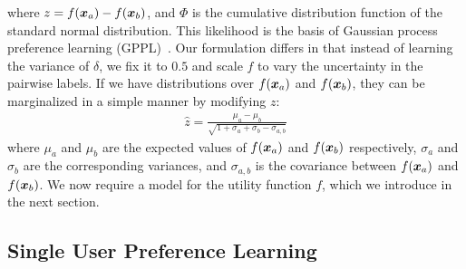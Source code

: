 where $z = f(\boldsymbol x_a) - f(\boldsymbol x_b)$,
and $\Phi$ is the cumulative distribution function of the standard normal distribution. 
This likelihood is the basis of Gaussian process preference learning (GPPL)~\citep{chu2005preference}. 
Our formulation differs in that instead of learning the variance of $\delta$, we fix it 
to $0.5$ and scale $f$ to vary the uncertainty in the pairwise labels.
If we have distributions over $f(\boldsymbol x_a)$ and $f(\boldsymbol x_b)$, they can be marginalized in a simple manner %
by modifying $z$:
\begin{align}
\hat{z} = \frac{\mu_a - \mu_b}{\sqrt{1 + \sigma_a + \sigma_b - \sigma_{a,b}} } \label{eq:predict_z}
\end{align}
where $\mu_a$ and $\mu_b$ are the expected values of $f(\boldsymbol x_a)$ and $f(\boldsymbol x_b)$ respectively, 
$\sigma_a$ and $\sigma_b$ are the corresponding variances,
and $\sigma_{a,b}$ is the covariance between $f(\boldsymbol x_a)$ and $f(\boldsymbol x_b)$.
We now require a model for the utility function $f$, which we introduce in the next section.

\subsection{Single User Preference Learning}

